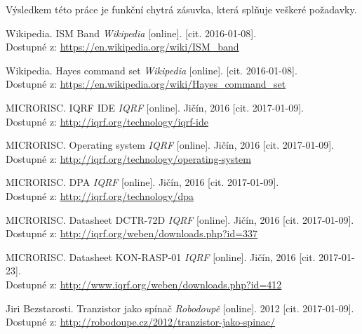 \documentclass[12pt,a4paper,oneside]{article}
\begin{document}

Výsledkem této práce je funkční chytrá zásuvka, která splňuje veškeré požadavky.

\newpage

\printindex[zkr]


\newpage

\begin{thebibliography}{99}


Wikipedia. ISM Band \emph{Wikipedia} [online]. [cit. 2016-01-08]. \\ Dostupné z: \url{https://en.wikipedia.org/wiki/ISM\_band}

Wikipedia. Hayes command set \emph{Wikipedia} [online]. [cit. 2016-01-08]. \\ Dostupné z: \url{https://en.wikipedia.org/wiki/Hayes\_command\_set}

MICRORISC. IQRF IDE \emph{IQRF} [online]. Jičín, 2016 [cit. 2017-01-09]. \\ Dostupné z: \url{http://iqrf.org/technology/iqrf-ide}

MICRORISC. Operating system \emph{IQRF} [online]. Jičín, 2016 [cit. 2017-01-09]. \\ Dostupné z: \url{http://iqrf.org/technology/operating-system}

MICRORISC. DPA \emph{IQRF} [online]. Jičín, 2016 [cit. 2017-01-09]. \\ Dostupné z: \url{http://iqrf.org/technology/dpa}

MICRORISC. Datasheet DCTR-72D \emph{IQRF} [online]. Jičín, 2016 [cit. 2017-01-09]. \\ Dostupné z: \url{http://iqrf.org/weben/downloads.php?id=337}

MICRORISC. Datasheet KON-RASP-01 \emph{IQRF} [online]. Jičín, 2016 [cit. 2017-01-23]. \\ Dostupné z: \url{http://www.iqrf.org/weben/downloads.php?id=412}

Jiri Bezstarosti. Tranzistor jako spínač \emph{Robodoupě} [online]. 2012 [cit. 2017-01-09]. \\ Dostupné z: \url{http://robodoupe.cz/2012/tranzistor-jako-spinac/}


\end{thebibliography}
\end{document}
